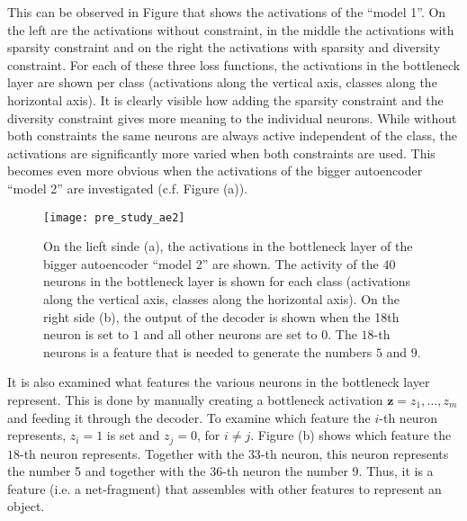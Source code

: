 This can be observed in Figure  that shows the activations of the ``model 1''.
On the left are the activations without constraint, in the middle the activations with sparsity constraint and on the right the activations with sparsity and diversity constraint.
For each of these three loss functions, the activations in the bottleneck layer are shown per class (activations along the vertical axis, classes along the horizontal axis).
It is clearly visible how adding the sparsity constraint and the diversity constraint gives more meaning to the individual neurons. While without both constraints the same neurons are always active independent of the class, the activations are significantly more varied when both constraints are used.
This becomes even more obvious when the activations of the bigger autoencoder ``model 2'' are investigated (c.f. Figure  (a)).

\begin{figure}[h]
    \centering
    \texttt{[image: pre\_study\_ae2]}
    \caption[Network activations of the bigger autoencoder network on the straight line dataset]{On the lieft sinde (a), the activations in the bottleneck layer of the bigger autoencoder ``model 2'' are shown. The activity of the $40$ neurons in the bottleneck layer is shown for each class (activations along the vertical axis, classes along the horizontal axis). On the right side (b), the output of the decoder is shown when the 18th neuron is set to $1$ and all other neurons are set to $0$. The $18$-th neurons is a feature that is needed to generate the numbers $5$ and $9$.}
\end{figure}

It is also examined what features the various neurons in the bottleneck layer represent.
This is done by manually creating a bottleneck activation $\boldsymbol{z} = z_1, ..., z_m$ and feeding it through the decoder.
To examine which feature the $i$-th neuron represents, $z_i=1$ is set and $z_{j}=0$, for $i \neq j$.
Figure  (b) shows which feature the $18$-th neuron represents. Together with the $33$-th neuron, this neuron represents the number 5 and together with the $36$-th neuron the number 9.
Thus, it is a feature (i.e. a net-fragment) that assembles with other features to represent an object.


